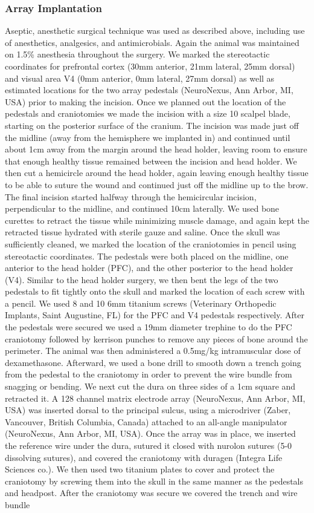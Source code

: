 \subsubsection*{Array Implantation} Aseptic, anesthetic surgical technique was used as described above, including use of anesthetics, analgesics, and antimicrobials. Again the animal was maintained on 1.5\% anesthesia throughout the surgery. We marked the stereotactic coordinates for prefrontal cortex (30mm anterior, 21mm lateral, 25mm dorsal) and visual area V4 (0mm anterior, 0mm lateral, 27mm dorsal) as well as estimated locations for the two array pedestals (NeuroNexus, Ann Arbor, MI, USA) prior to making the incision. Once we planned out the location of the pedestals and craniotomies we made the incision with a size 10 scalpel blade, starting on the posterior surface of the cranium. The incision was made just off the midline (away from the hemisphere we implanted in) and continued until about 1cm away from the margin around the head holder, leaving room to ensure that enough healthy tissue remained between the incision and head holder. We then cut a hemicircle around the head holder, again leaving enough healthy tissue to be able to suture the wound and continued just off the midline up to the brow. The final incision started halfway through the hemicircular incision, perpendicular to the midline, and continued 10cm laterally. We used bone curettes to retract the tissue while minimizing muscle damage, and again kept the retracted tissue hydrated with sterile gauze and saline. Once the skull was sufficiently cleaned, we marked the location of the craniotomies in pencil using stereotactic coordinates. The pedestals were both placed on the midline, one anterior to the head holder (PFC), and the other posterior to the head holder (V4). Similar to the head holder surgery, we then bent the legs of the two pedestals to fit tightly onto the skull and marked the location of each screw with a pencil. We used 8 and 10 6mm titanium screws (Veterinary Orthopedic Implants, Saint Augustine, FL) for the PFC and V4 pedestals respectively. After the pedestals were secured we used a 19mm diameter trephine to do the PFC craniotomy followed by kerrison punches to remove any pieces of bone around the perimeter. The animal was then administered a 0.5mg/kg intramuscular dose of dexamethasone. Afterward, we used a bone drill to smooth down a trench going from the pedestal to the craniotomy in order to prevent the wire bundle from snagging or bending. We next cut the dura on three sides of a 1cm square and retracted it. A 128 channel matrix electrode array (NeuroNexus, Ann Arbor, MI, USA) was inserted dorsal to the principal sulcus, using a microdriver (Zaber, Vancouver, British Columbia, Canada) attached to an all-angle manipulator (NeuroNexus, Ann Arbor, MI, USA). Once the array was in place, we inserted the reference wire under the dura, sutured it closed with nurolon sutures (5-0 dissolving sutures), and covered the craniotomy with duragen (Integra Life Sciences co.). We then used two titanium plates to cover and protect the craniotomy by screwing them into the skull in the same manner as the pedestals and headpost. After the craniotomy was secure we covered the trench and wire bundle 